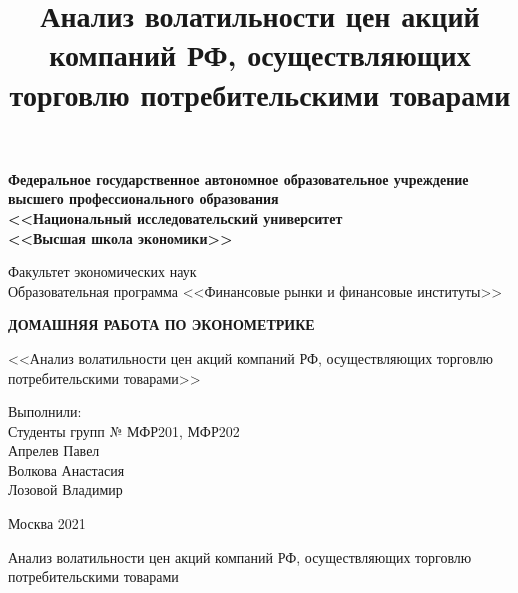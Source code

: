 \documentclass[a4paper,12pt,twoside]{article}
\title{Анализ волатильности цен акций компаний РФ, осуществляющих торговлю потребительскими товарами}
\begin{document}


\thispagestyle{empty}
\begin{center}
    \textbf{Федеральное государственное автономное образовательное учреждение\\ высшего профессионального образования\\
<<Национальный исследовательский университет\\  <<Высшая школа экономики>>}

    \vspace{8ex}
    \begin{center}
        Факультет экономических наук\\
        \vspace{4ex}
        Образовательная программа <<Финансовые рынки и финансовые институты>>
    \end{center}
\end{center}
\vspace{7ex}

\begin{center}
    {\textbf{ДОМАШНЯЯ РАБОТА ПО ЭКОНОМЕТРИКЕ
    }}
    \vspace{1ex}

    <<Анализ волатильности цен акций компаний РФ, осуществляющих торговлю потребительскими товарами>>
\end{center}
\vspace{20ex}
\begin{flushright}
  \noindent
  Выполнили:\\
  \vspace{1ex}
    \noindent
    Студенты групп № МФР201, МФР202\\
    Апрелев Павел\\
    Волкова Анастасия\\
    Лозовой Владимир


\end{flushright}

\vfill

\begin{center}
    Москва 2021

\end{center}
\newpage


\vspace{25ex}
\begin{center}
  \Large{Анализ волатильности цен акций компаний РФ, осуществляющих торговлю потребительскими товарами}
\end{center}
\end{document}
